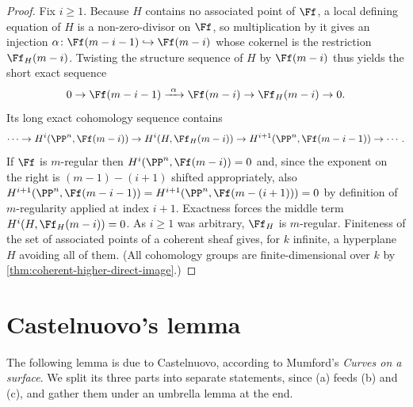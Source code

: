 \begin{proof}
  \leanok
  Fix $i\ge 1$. Because $H$ contains no associated point of $\Ff$, a local
  defining equation of $H$ is a non-zero-divisor on $\Ff$, so multiplication by
  it gives an injection $\alpha\colon \Ff(m-i-1)\hookrightarrow \Ff(m-i)$ whose
  cokernel is the restriction $\Ff_H(m-i)$. Twisting the structure sequence of
  $H$ by $\Ff(m-i)$ thus yields the short exact sequence
  \[
    0 \to \Ff(m-i-1) \xrightarrow{\ \alpha\ } \Ff(m-i) \to \Ff_H(m-i) \to 0 .
  \]
  Its long exact cohomology sequence contains
  \[
    \cdots \to H^i(\PP^n,\Ff(m-i)) \to H^i(H,\Ff_H(m-i))
      \to H^{i+1}(\PP^n,\Ff(m-i-1)) \to \cdots .
  \]
  If $\Ff$ is $m$-regular then $H^i(\PP^n,\Ff(m-i)) = 0$ and, since the
  exponent on the right is $(m-1)-(i+1)$ shifted appropriately, also
  $H^{i+1}(\PP^n,\Ff(m-i-1)) = H^{i+1}(\PP^n,\Ff(m-(i+1)))=0$ by definition of
  $m$-regularity applied at index $i+1$. Exactness forces the middle term
  $H^i(H,\Ff_H(m-i)) = 0$. As $i\ge1$ was arbitrary, $\Ff_H$ is $m$-regular.
  Finiteness of the set of associated points of a coherent sheaf gives, for $k$
  infinite, a hyperplane $H$ avoiding all of them. (All cohomology groups are
  finite-dimensional over $k$ by \cref{thm:coherent-higher-direct-image}.)
\end{proof}

\section{Castelnuovo's lemma}

The following lemma is due to Castelnuovo, according to Mumford's \emph{Curves on
a surface}. We split its three parts into separate statements, since (a) feeds
(b) and (c), and gather them under an umbrella lemma at the end.

